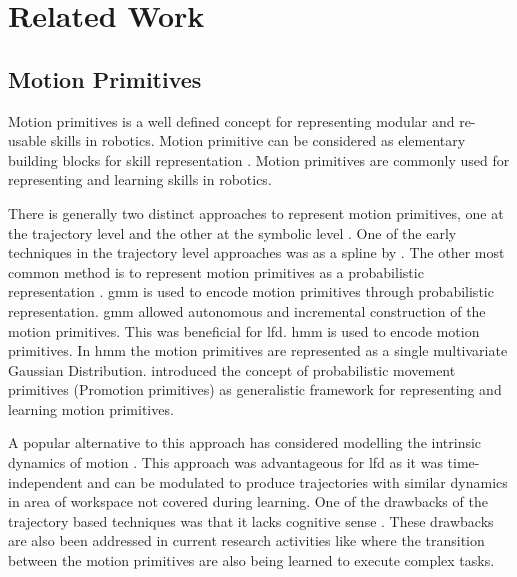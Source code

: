 \section{ Related Work } 
\subsection{Motion Primitives}

Motion primitives is a well defined concept for representing modular and
re-usable skills in robotics. Motion primitive can be considered as
elementary building blocks for skill representation \cite{kruger_learning_2010}.
Motion primitives are commonly used for representing and learning skills in
robotics.

There is generally two distinct approaches to represent motion primitives, one
at the trajectory level and the other at the symbolic level \cite{argall_survey_2009}.
One of the early techniques in the trajectory level approaches was as a spline
by \cite{ude_trajectory_1993}. The other most common method is to represent
motion primitives as a  probabilistic representation \cite{calinon_robot_2009}.
\acrfull{gmm} is used to encode motion primitives through probabilistic
representation. \acrshort{gmm} allowed autonomous and incremental construction
of the motion primitives. This was beneficial for \acrshort{lfd}. \acrfull{hmm}
is used to encode motion primitives. In \acrshort{hmm} the motion primitives
are represented as a single multivariate Gaussian Distribution.
\cite{paraschos_probabilistic_2013} introduced the concept of probabilistic
movement primitives (Promotion primitives) as generalistic framework for
representing and learning motion primitives.

A popular alternative to this approach has considered modelling the intrinsic
dynamics of motion \cite{schaal_nonlinear_2000} . This approach was advantageous
for \acrshort{lfd} as it was time-independent and can be modulated to produce trajectories
with similar dynamics in area of workspace not covered during learning. One of
the drawbacks of the trajectory based techniques was that it lacks cognitive
sense \cite{aein_toward_2013}. These
drawbacks are also been addressed in current research activities like
\cite{manschitz_learning_2015} where the transition between
the motion primitives are also being learned to execute complex tasks.

